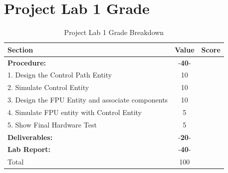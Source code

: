 \documentclass{article}
\begin{document}
\newpage

\section{Project Lab 1 Grade}

\begin{table}[!htb]
  \begin{center}
    \begin{tabular}[width=0.9\textwidth]{|l|c|l|}
       \hline
       Section & Value & Score\\
       \hline 
       \multicolumn{1}{|l}{\textbf{Procedure:}}  & -\textbf{40}- &\\
       \hline
       1. Design the Control Path Entity & 10 &\\
       \hline
       2. Simulate Control Entity & 10 &\\
       \hline
       3. Design the FPU Entity and associate components & 10 &\\
       \hline
       4. Simulate FPU entity with Control Entity & 5 &\\
       \hline
       5. Show Final Hardware Test & 5 &\\
       \hline
       \multicolumn{1}{|l}{\textbf{Deliverables:}}  & -\textbf{20}- &\\
       \hline
       \multicolumn{1}{|l}{\textbf{Lab Report:}}  & -\textbf{40}- &\\
       \hline
       \hline
       \multicolumn{1}{|l}{Total} & \multicolumn{1}{c|}{100} &\\
       \hline
    \end{tabular}
  \end{center}
  \caption{Project Lab 1 Grade Breakdown}
\end{table}
\end{document}
